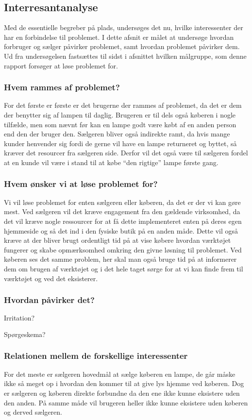 \subsection{Interresantanalyse}
Med de essentielle begreber på plads, undersøges det nu, hvilke interessenter der har en forbindelse til problemet. I dette afsnit er målet at undersøge hvordan forbruger og sælger påvirker problemet, samt hvordan problemet påvirker dem. Ud fra undersøgelsen fastsættes til sidst i afsnittet hvilken målgruppe, som denne rapport forsøger at løse problemet for. 

\subsubsection{Hvem rammes af problemet?}
For det første er første er det brugerne der rammes af problemet, da det er dem der benytter sig af lampen til daglig. Brugeren er til dels også køberen i nogle tilfælde, men som nævnt før kan en lampe godt være købt af en anden person end den der bruger den.
Sælgeren bliver også indirekte ramt, da hvis mange kunder henvender sig fordi de gerne vil have en lampe returneret og byttet, så kræver det resourcer fra sælgeren side. Derfor vil det også være til sælgeren fordel at en kunde vil være i stand til at købe “den rigtige” lampe første gang.
 
\subsubsection{Hvem ønsker vi at løse problemet for?}
Vi vil løse problemet for enten sælgeren eller køberen, da det er der vi kan gøre mest. Ved sælgeren vil det kræve engagement fra den gældende virksomhed, da det vil kræve nogle ressourcer for at få dette implementeret enten på deres egen hjemmeside og så det ind i den fysiske butik på en anden måde. Dette vil også kræve at der bliver brugt ordentligt tid på at vise købere hvordan værktøjet fungerer og skabe opmærksomhed omkring den givne løsning til problemet.
Ved køberen ses det samme problem, her skal man også bruge tid på at informerer dem om brugen af værktøjet og i det hele taget sørge for at vi kan finde frem til værktøjet og ved det eksisterer.
 
\subsubsection{Hvordan påvirker det?}

Irritation?
 
Spørgeskema?
 
\subsubsection{Relationen mellem de forskellige interessenter}
For det meste er sælgeren hovedmål at sælge køberen en lampe, de går måske ikke så meget op i hvordan den kommer til at give lys hjemme ved køberen. Dog er sælgeren og køberen direkte forbundne da den ene ikke kunne eksistere uden den anden.  På samme måde vil brugeren heller ikke kunne eksistere uden køberen og derved sælgeren.
 

